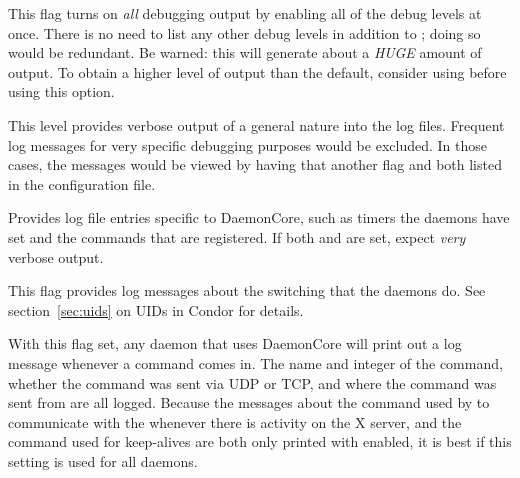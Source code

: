 \begin{description}
  \begin{description}
    \label{list:debug-level-description}

  \item[\Dflag{ALL}] \label{dflag:all}
    This flag turns on \emph{all} debugging output by enabling all of the debug
    levels at once.  There is no need to list any other debug levels in addition
    to ; doing so would be redundant.  Be warned: this will
    generate
    about a \emph{HUGE} amount of output.
    To obtain a higher
    level of output than the default, consider using  before
    using this option.

  \item[\Dflag{FULLDEBUG}] \label{dflag:fulldebug}
    This level
    provides verbose output of a general nature into the log files.  
    Frequent log messages for very specific debugging
    purposes would be excluded. In those cases, the messages would
    be viewed by having that another flag and  both
    listed in the configuration file.

  \item[\Dflag{DAEMONCORE}] \label{dflag:daemoncore} 
    Provides log
    file entries specific to DaemonCore, such as
    timers the daemons have set and the commands that are registered.
    If both  and  are set,
    expect \emph{very} verbose output.

  \item[\Dflag{PRIV}] \label{dflag:priv}
    This flag provides log
    messages about the  switching that the daemons
    do.  See section~\ref{sec:uids} on UIDs in Condor for details.

  \item[\Dflag{COMMAND}] \label{dflag:command}
    With this flag set, any
    daemon that uses DaemonCore will print out a log message
    whenever a command comes in.  The name and integer of the command,
    whether the command was sent via UDP or TCP, and where
    the command was sent from are all logged.  
    Because the messages about the command used by  to
    communicate with the  whenever there is activity on
    the X server, and the command used for keep-alives are both only
    printed with  enabled, it is best if this setting
    is used for all daemons.


\end{description}
\end{description}
